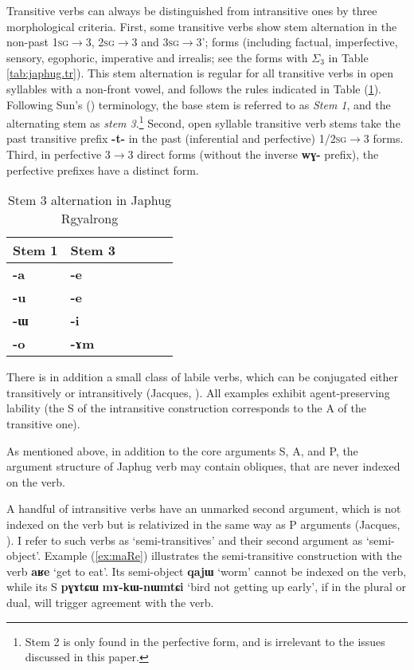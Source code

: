 \documentclass[oneside,a4paper,11pt]{article}
\newcommand{\ipa}[1]{{\phon\textbf{\mbox{#1}}}} %
\newcommand{\refb}[1]{(\ref{#1})}
\newcommand{\sigc}{$\Sigma_3$}
\begin{document}
Transitive verbs can always be distinguished from intransitive ones by three morphological criteria. First, some transitive verbs show stem alternation in the non-past \textsc{1sg}$\rightarrow$3, \textsc{2sg}$\rightarrow$3 and \textsc{3sg}$\rightarrow$3'; forms (including factual, imperfective, sensory, egophoric, imperative and irrealis; see the forms with \sigc{} in Table \ref{tab:japhug.tr}). This stem alternation is regular for all transitive verbs in open syllables with a non-front vowel, and follows the rules indicated  in Table \refb{tab:stem3}. Following Sun's (\citeyear{jackson00puxi}) terminology, the base stem is referred to as \textit{Stem 1}, and the alternating stem as \textit{stem 3}.\footnote{Stem 2 is only found in the perfective form, and is irrelevant to the issues discussed in this paper.}  Second, open syllable transitive verb stems take the past transitive prefix \ipa{-t-} in the past (inferential and perfective) \textsc{1/2sg}$\rightarrow$3 forms.  Third, in perfective 3$\rightarrow$3 direct forms (without the inverse \ipa{wɣ-} prefix), the perfective prefixes have a distinct form.

 \begin{table}[H]
\caption{Stem 3 alternation in Japhug Rgyalrong} \label{tab:stem3} \centering
\begin{tabular}{llllll}
\toprule
Stem 1 & Stem 3 \\
\midrule
\ipa{-a} & \ipa{-e} \\
\ipa{-u} & \ipa{-e} \\
\ipa{-ɯ} & \ipa{-i} \\
\ipa{-o} & \ipa{-ɤm} \\
\bottomrule
\end{tabular}
\end{table}

There is in addition a small class of labile verbs, which can be conjugated either transitively or intransitively (Jacques, \citeyear{jacques12demotion}). All examples exhibit agent-preserving  lability (the S of the intransitive construction corresponds to the A of the transitive one).
  
As mentioned above, in addition to the core arguments S, A, and P, the argument structure of Japhug verb may contain obliques, that are never indexed on the verb.
  
A handful of intransitive verbs have an unmarked second argument, which is not indexed on the verb but is relativized in the same way as P arguments (Jacques, \citeyear{jacques16relatives}). I refer to such verbs as `semi-transitives' and their second argument as `semi-object'.  Example \refb{ex:maRe} illustrates the semi-transitive construction with the verb \ipa{aʁe} `get to eat'. Its semi-object \ipa{qajɯ} `worm' cannot be indexed on the verb, while its S \ipa{pɣɤtɕɯ}  	\ipa{mɤ-kɯ-nɯmtɕi}  `bird not getting up early', if in the plural or dual, will trigger agreement with the verb.
  
\end{document}
